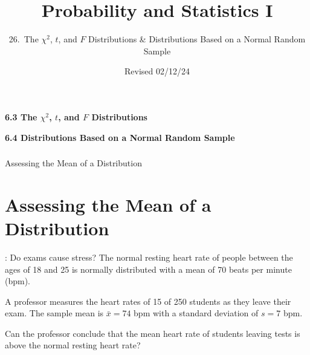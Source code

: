 
  
\newcommand{\lecturenum}{26}

\title[SS2857]{Probability and Statistics I}
\subtitle{\lecturenum.~The $\chi^2$, $t$, and $F$ Distributions \& Distributions Based on a Normal Random Sample}

\date{Revised 02/12/24}






{

\begin{frame}
  \addtocounter{framenumber}{-1}

  \maketitle
\end{frame}
}

\begin{frame}
  \frametitle{}
  
  \begin{center}
    \Large{\textbf{6.3 The $\chi^2$, $t$, and $F$ Distributions}}
    
    \Large{\textbf{6.4 Distributions Based on a Normal Random Sample}}

  \end{center}
  
\end{frame}

\begin{frame}
\frametitle{}
  
  \begin{center}
    \Large{Assessing the Mean of a Distribution}
  \end{center}
\end{frame}

\section{Assessing the Mean of a Distribution}

\begin{frame}
  
  \begin{block}{\example: Do exams cause stress?}
  The normal resting heart rate of people between the ages of 18 and 25 is normally distributed with a mean of 70 beats per minute (bpm).
  
  \medskip
  
  A professor measures the heart rates of 15 of 250 students as they leave their exam. The sample mean is $\bar x=74$ bpm with a standard deviation of $s=7$ bpm. 
  
  \medskip
  
  Can the professor conclude that the mean heart rate of students leaving tests is above the normal resting heart rate? 
  
  \end{block}
\end{frame}


